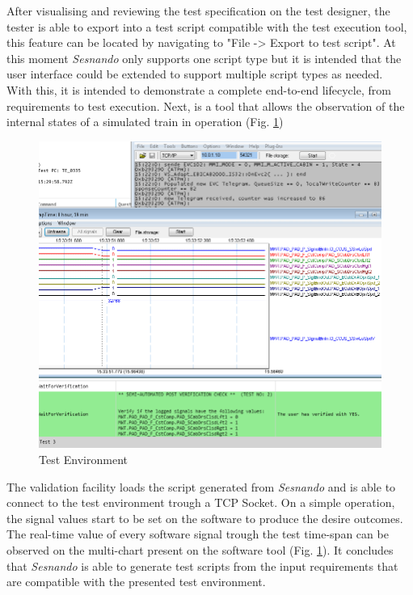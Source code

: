 After visualising and reviewing the test specification on the test designer, the tester is able to export into a test script compatible with the test execution tool, this feature can be located by navigating to "File -> Export to test script". At this moment \textit{Sesnando} only supports one script type but it is intended that the user interface could be extended to support multiple script types as needed.\\
With this, it is intended to demonstrate a complete end-to-end lifecycle, from requirements to test execution. Next, is a tool that allows the observation of the internal states of a simulated train in operation (Fig. \ref{fig:test_environment})

\begin{figure}[H]
    \centering
    \includegraphics[width=\textwidth]{images/test_environment.png}
    \caption{Test Environment}
    \label{fig:test_environment}
\end{figure}

The validation facility loads the script generated from \textit{Sesnando} and is able to connect to the test environment trough a TCP Socket. On a simple operation, the signal values start to be set on the software to produce the desire outcomes. The real-time value of every software signal trough the test time-span can be observed on the multi-chart present on the software tool (Fig. \ref{fig:test_environment}). It concludes that \textit{Sesnando} is able to generate test scripts from the input requirements that are compatible with the presented test environment.




